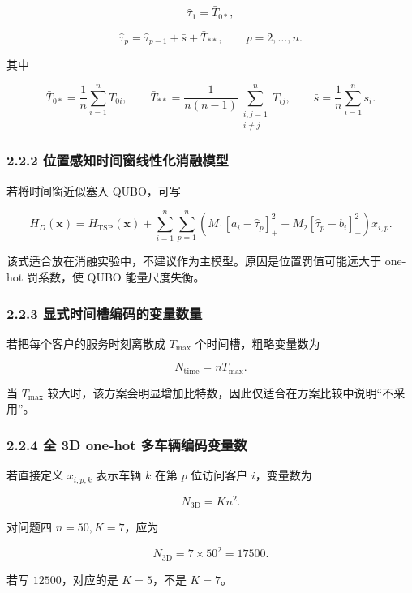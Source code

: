 \documentclass[
  a4paper,
]{ctexart}
\begin{document}
\[
\widehat\tau_1=\bar T_{0*},
\]

\[
\widehat\tau_p=\widehat\tau_{p-1}+\bar s+\bar T_{**},\qquad p=2,\ldots,n.
\]

其中

\[
\bar T_{0*}=\frac{1}{n}\sum_{i=1}^{n}T_{0i},
\qquad
\bar T_{**}=\frac{1}{n(n-1)}\sum_{\substack{i,j=1\\i\ne j}}^{n}T_{ij},
\qquad
\bar s=\frac{1}{n}\sum_{i=1}^{n}s_i.
\]

\subsubsection{2.2.2
位置感知时间窗线性化消融模型}\label{ux4f4dux7f6eux611fux77e5ux65f6ux95f4ux7a97ux7ebfux6027ux5316ux6d88ux878dux6a21ux578b}

若将时间窗近似塞入 QUBO，可写

\[
H_D(\mathbf{x})=H_{\mathrm{TSP}}(\mathbf{x})+
\sum_{i=1}^{n}\sum_{p=1}^{n}\left(M_1[a_i-\widehat\tau_p]_+^2+M_2[\widehat\tau_p-b_i]_+^2\right)x_{i,p}.
\]

该式适合放在消融实验中，不建议作为主模型。原因是位置罚值可能远大于
one-hot 罚系数，使 QUBO 能量尺度失衡。

\subsubsection{2.2.3
显式时间槽编码的变量数量}\label{ux663eux5f0fux65f6ux95f4ux69fdux7f16ux7801ux7684ux53d8ux91cfux6570ux91cf}

若把每个客户的服务时刻离散成 \(T_{\max}\) 个时间槽，粗略变量数为

\[
N_{\mathrm{time}}=nT_{\max}.
\]

当 \(T_{\max}\)
较大时，该方案会明显增加比特数，因此仅适合在方案比较中说明``不采用''。

\subsubsection{2.2.4 全 3D one-hot
多车辆编码变量数}\label{ux5168-3d-one-hot-ux591aux8f66ux8f86ux7f16ux7801ux53d8ux91cfux6570}

若直接定义 \(x_{i,p,k}\) 表示车辆 \(k\) 在第 \(p\) 位访问客户
\(i\)，变量数为

\[
N_{\mathrm{3D}}=Kn^2.
\]

对问题四 \(n=50,K=7\)，应为

\[
N_{\mathrm{3D}}=7\times 50^2=17500.
\]

若写 \(12500\)，对应的是 \(K=5\)，不是 \(K=7\)。
\end{document}
